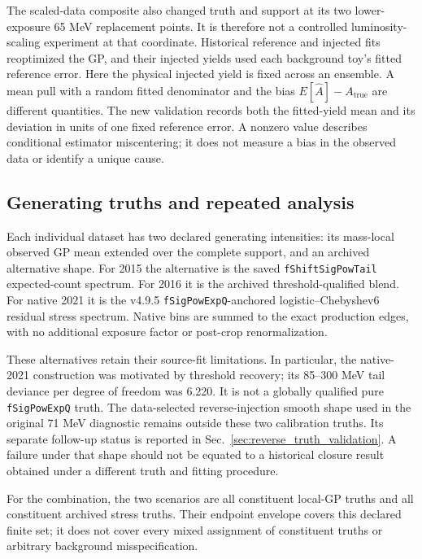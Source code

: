 \documentclass[11pt]{article}
\begin{document}
The scaled-data composite also changed truth and support at its two
lower-exposure 65 MeV replacement points. It is therefore not a controlled
luminosity-scaling experiment at that coordinate. Historical reference and
injected fits reoptimized the GP, and their injected yields used each
background toy's fitted reference error. Here the physical injected yield
is fixed across an ensemble. A mean pull with a random fitted denominator
and the bias $E[\hat A]-A_{\mathrm{true}}$ are different quantities.
The new validation records both the fitted-yield mean and its deviation in
units of one fixed reference error. A nonzero value describes conditional
estimator miscentering; it does not measure a bias in the observed data or
identify a unique cause.

\clearpage
\subsection{Generating truths and repeated analysis}

Each individual dataset has two declared generating intensities: its
mass-local observed GP mean extended over the complete support, and an
archived alternative shape. For 2015 the alternative is the saved
\texttt{fShiftSigPowTail} expected-count spectrum. For 2016 it is the archived
threshold-qualified blend. For native 2021 it is the v4.9.5
\texttt{fSigPowExpQ}-anchored logistic--Chebyshev6 residual stress spectrum.
Native bins are summed to the exact production edges, with no additional
exposure factor or post-crop renormalization.

These alternatives retain their source-fit limitations. In particular,
the native-2021 construction was motivated by threshold recovery; its
85--300 MeV tail deviance per degree of freedom was 6.220. It is not a
globally qualified pure \texttt{fSigPowExpQ} truth. The data-selected
reverse-injection smooth shape used in the original 71 MeV diagnostic
remains outside these two calibration truths. Its separate follow-up status
is reported in Sec.~\ref{sec:reverse_truth_validation}. A failure under that
shape should not be equated to a historical closure result obtained under
a different truth and fitting procedure.

For the combination, the two scenarios are all constituent local-GP
truths and all constituent archived stress truths. Their endpoint envelope
covers this declared finite set; it does not cover every mixed assignment
of constituent truths or arbitrary background misspecification.
\end{document}
